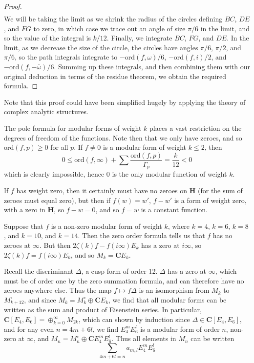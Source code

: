 \begin{proof}
\begin{align*}
    \end{align*}
    We will be taking the limit as we shrink the radius of the circles defining $BC$, $DE$, and $FG$ to zero, in which case we trace out an angle of size $\pi/6$ in the limit, and so the value of the integral is $k/12$. Finally, we integrate $BC$, $FG$, and $DE$. In the limit, as we decrease the size of the circle, the circles have angles $\pi/6$, $\pi/2$, and $\pi/6$, so the path integrals integrate to $- \text{ord}(f,\omega)/6$, $- \text{ord}(f,i)/2$, and $- \text{ord}(f, -\overline{\omega})/6$. Summing up these integrals, and then combining them with our original deduction in terms of the residue theorem, we obtain the required formula.
\end{proof}

Note that this proof could have been simplified hugely by applying the theory of complex analytic structures.

The pole formula for modular forms of weight $k$ places a vast restriction on the degrees of freedom of the functions. Note then that we only have zeroes, and so $\text{ord}(f,p) \geq 0$ for all $p$. If $f \neq 0$ is a modular form of weight $k \leq 2$, then
%
\[ 0 \leq \text{ord}(f, \infty) + \sum \frac{\text{ord}(f, p)}{\Gamma_p} = \frac{k}{12} < 0 \]
%
which is clearly impossible, hence 0 is the only modular function of weight $k$.

If $f$ has weight zero, then it certainly must have no zeroes on $\mathbf{H}$ (for the sum of zeroes must equal zero), but then if $f(w) = w'$, $f - w'$ is a form of weight zero, with a zero in $\mathbf{H}$, so $f - w = 0$, and so $f = w$ is a constant function.

Suppose that $f$ is a non-zero modular form of weight $k$, where $k = 4$, $k = 6$, $k = 8$, and $k = 10$, and $k = 14$. Then the zero order formula tells us that $f$ has no zeroes at $\infty$. But then $2 \zeta(k) f - f(i \infty) E_k$ has a zero at $i \infty$, so $2 \zeta(k) f =  f(i \infty) E_k$, and so $M_k = \mathbf{C} E_k$.

Recall the discriminant $\Delta$, a cusp form of order 12. $\Delta$ has a zero at $\infty$, which must be of order one by the zero summation formula, and can therefore have no zeroes anywhere else. Thus the map $f \mapsto f \Delta$ is an isomorphism from $M_k$ to $M_{k+12}^\circ$, and since $M_k = M_k^\circ \oplus \mathbf{C} E_k$, we find that all modular forms can be written as the sum and product of Eisenstein series. In particular, $\mathbf{C}[E_4,E_6] = \oplus_{k = 0}^\infty M_{2k}$, which can shown by induction since $\Delta \in \mathbf{C}[E_4,E_6]$, and for any even $n = 4m + 6l$, we find $E_4^m E_6^l$ is a modular form of order $n$, non-zero at $\infty$, and $M_n = M_n^\circ \oplus \mathbf{C} E_4^m E_6^l$. Thus all elements in $M_n$ can be written
%
\[ \sum_{4m + 6l = n} a_{m,l} E_4^m E_6^l \]

